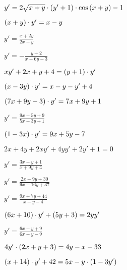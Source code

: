 \begin{multicols}{2}
\begin{enumtasks}
			\item \( y' = 2\sqrt{x + y} \cdot \left( y' + 1 \right) \cdot \cos{ \left( x + y \right) } - 1 \)		%
			\item \( \left( x + y \right) \cdot y' = x - y \)												%
			\item \( y' = \frac{x + 2y}{2x - y} \)													%
			\item \( y' = - \frac{y + 2}{x + 6y - 3} \) 											%
			\item \( xy' + 2x + y + 4 = \left( y + 1 \right) \cdot y' \) 									%
			\item \( \left( x - 3y \right) \cdot y' = x - y - y' + 4 \) 									%
			\item \( \left( 7x + 9y - 3 \right) \cdot y' = 7x + 9y + 1 \) 									%
			\item \( y' = \frac{9x - 5y + 9}{5x - 3y + 1} \) 										%
			\item \( \left( 1 - 3x \right) \cdot y' = 9x + 5y - 7 \)										%
			\item \( 2x + 4y + 2xy' + 4yy' + 2y' + 1 = 0 \) 										%
			\item \( y' =  \frac{3x - y + 1}{x + 9y + 4} \)											%
			\item \( y' =  \frac{2x - 9y + 30}{9x - 16y + 37} \)									%
			\item \( y' =  \frac{9x + 7y + 44}{x - y - 4} \)										%
			\item \( \left( 6x + 10 \right) \cdot y' + \left( 5y + 3 \right) = 2yy' \)							%
			\item \( y' = \frac{6x - y + 9}{6x - y - 9} \)											%
			\item \( 4y' \cdot \left( 2x + y + 3 \right) = 4y - x - 33 \)									%
			\item \( \left( x + 14 \right) \cdot y' + 42 = 5x - y \cdot \left( 1 - 3y' \right) \)					%

		\end{enumtasks}
	\end{multicols}
